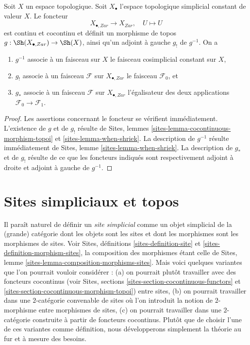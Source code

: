 \begin{lemma}
\label{lemma-constant-simplicial-space}
Soit $X$ un espace topologique. Soit $X_\bullet$ l'espace topologique
simplicial constant de valeur $X$. Le foncteur
$$
X_{\bullet, Zar} \longrightarrow X_{Zar},\quad
U \longmapsto U
$$
est continu et cocontinu et définit un morphisme de
topos $g : \Sh(X_{\bullet, Zar}) \to \Sh(X)$, ainsi qu'un adjoint à gauche
$g_!$ de $g^{-1}$. On a
\begin{enumerate}
\item $g^{-1}$ associe à un faisceau sur $X$ le faisceau cosimplicial
constant sur $X$,
\item $g_!$ associe à un faisceau $\mathcal{F}$ sur $X_{\bullet, Zar}$ le
faisceau $\mathcal{F}_0$, et
\item $g_*$ associe à un faisceau $\mathcal{F}$ sur $X_{\bullet, Zar}$
l'égalisateur des deux applications $\mathcal{F}_0 \to \mathcal{F}_1$.
\end{enumerate}
\end{lemma}

\begin{proof}
Les assertions concernant le foncteur se vérifient immédiatement.
L'existence de $g$ et de $g_!$ résulte de
Sites, lemmes \ref{sites-lemma-cocontinuous-morphism-topoi} et
\ref{sites-lemma-when-shriek}. La description de
$g^{-1}$ résulte immédiatement de Sites, lemme \ref{sites-lemma-when-shriek}.
La description de $g_*$ et de $g_!$ résulte de ce que les foncteurs indiqués sont
respectivement adjoint à droite et adjoint à gauche de $g^{-1}$.
\end{proof}








\section{Sites simpliciaux et topos}
\label{section-simplicial-sites}

\noindent
Il paraît naturel de définir un {\it site simplicial} comme un objet
simplicial de la (grande) catégorie dont les objets sont les sites
et dont les morphismes sont les morphismes de sites.
Voir Sites, définitions \ref{sites-definition-site} et
\ref{sites-definition-morphism-sites},
la composition des morphismes étant celle de
Sites, lemme \ref{sites-lemma-composition-morphisms-sites}.
Mais voici quelques variantes que l'on pourrait vouloir considérer :
(a) on pourrait plutôt travailler avec des foncteurs cocontinus
(voir Sites, sections \ref{sites-section-cocontinuous-functors} et
\ref{sites-section-cocontinuous-morphism-topoi}) entre sites,
(b) on pourrait travailler dans une $2$-catégorie convenable de sites où l'on introduit
la notion de $2$-morphisme entre morphismes de sites,
(c) on pourrait travailler dans une $2$-catégorie construite à partir de foncteurs
cocontinus. Plutôt que de choisir l'une de ces variantes comme définition,
nous développerons simplement la théorie au fur et à mesure des besoins.

